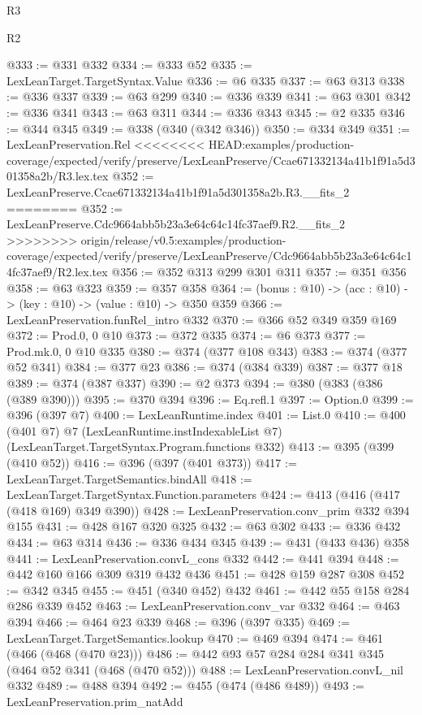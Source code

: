 \begin{lexlean}{R3}
\begin{lexlean}{R2}
\begin{coremodule}
{{{{{{{{{{{{{{{{{{{{{{@333 := @331 @332
@334 := @333 @52
@335 := LexLeanTarget.TargetSyntax.Value
@336 := @6 @335
@337 := @63 @313
@338 := @336 @337
@339 := @63 @299
@340 := @336 @339
@341 := @63 @301
@342 := @336 @341
@343 := @63 @311
@344 := @336 @343
@345 := @2 @335
@346 := @344 @345
@349 := @338 (@340 (@342 @346))
@350 := @334 @349
@351 := LexLeanPreservation.Rel
<<<<<<<< HEAD:examples/production-coverage/expected/verify/preserve/LexLeanPreserve/Ccae671332134a41b1f91a5d301358a2b/R3.lex.tex
@352 := LexLeanPreserve.Ccae671332134a41b1f91a5d301358a2b.R3.__fits_2
========
@352 := LexLeanPreserve.Cdc9664abb5b23a3e64c64c14fc37aef9.R2.__fits_2
>>>>>>>> origin/release/v0.5:examples/production-coverage/expected/verify/preserve/LexLeanPreserve/Cdc9664abb5b23a3e64c64c14fc37aef9/R2.lex.tex
@356 := @352 @313 @299 @301 @311
@357 := @351 @356
@358 := @63 @323
@359 := @357 @358
@364 := (bonus : @10) -> (acc : @10) -> (key : @10) -> (value : @10) -> @350 @359
@366 := LexLeanPreservation.funRel_intro @332
@370 := @366 @52 @349 @359 @169
@372 := Prod.{0, 0} @10
@373 := @372 @335
@374 := @6 @373
@377 := Prod.mk.{0, 0} @10 @335
@380 := @374 (@377 @108 @343)
@383 := @374 (@377 @52 @341)
@384 := @377 @23
@386 := @374 (@384 @339)
@387 := @377 @18
@389 := @374 (@387 @337)
@390 := @2 @373
@394 := @380 (@383 (@386 (@389 @390)))
@395 := @370 @394
@396 := Eq.refl.{1}
@397 := Option.{0}
@399 := @396 (@397 @7)
@400 := LexLeanRuntime.index
@401 := List.{0}
@410 := @400
    (@401 @7)
    @7
    (LexLeanRuntime.instIndexableList @7)
    (LexLeanTarget.TargetSyntax.Program.functions @332)
@413 := @395 (@399 (@410 @52))
@416 := @396 (@397 (@401 @373))
@417 := LexLeanTarget.TargetSemantics.bindAll
@418 := LexLeanTarget.TargetSyntax.Function.parameters
@424 := @413 (@416 (@417 (@418 @169) @349 @390))
@428 := LexLeanPreservation.conv_prim @332 @394 @155
@431 := @428 @167 @320 @325
@432 := @63 @302
@433 := @336 @432
@434 := @63 @314
@436 := @336 @434 @345
@439 := @431 (@433 @436) @358
@441 := LexLeanPreservation.convL_cons @332
@442 := @441 @394
@448 := @442 @160 @166 @309 @319 @432 @436
@451 := @428 @159 @287 @308
@452 := @342 @345
@455 := @451 (@340 @452) @432
@461 := @442 @55 @158 @284 @286 @339 @452
@463 := LexLeanPreservation.conv_var @332
@464 := @463 @394
@466 := @464 @23 @339
@468 := @396 (@397 @335)
@469 := LexLeanTarget.TargetSemantics.lookup
@470 := @469 @394
@474 := @461 (@466 (@468 (@470 @23)))
@486 := @442 @93 @57 @284 @284 @341 @345 (@464 @52 @341 (@468 (@470 @52)))
@488 := LexLeanPreservation.convL_nil @332
@489 := @488 @394
@492 := @455 (@474 (@486 @489))
@493 := LexLeanPreservation.prim_natAdd
}}}}}}}}}}}}}}}}}}}}}}
\end{coremodule}
\end{lexlean}
\end{lexlean}
